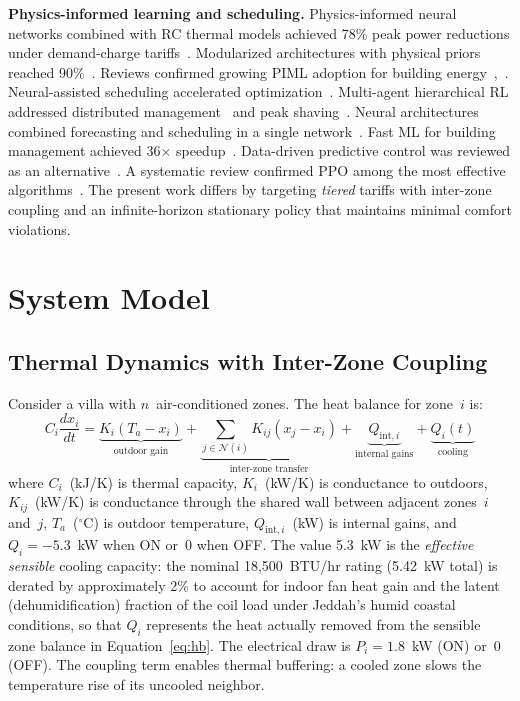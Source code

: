 \documentclass[12pt,a4paper]{article}
\begin{document}
\textbf{Physics-informed learning and scheduling.} Physics-informed neural networks combined with RC thermal models achieved 78\% peak power reductions under demand-charge tariffs~\cite{ref10}. Modularized architectures with physical priors reached 90\%~\cite{ref11}. Reviews confirmed growing PIML adoption for building energy~\cite{ref23},~\cite{ref24}. Neural-assisted scheduling accelerated optimization~\cite{ref25}. Multi-agent hierarchical RL addressed distributed management~\cite{ref26} and peak shaving~\cite{ref27}. Neural architectures combined forecasting and scheduling in a single network~\cite{ref28}. Fast ML for building management achieved 36$\times$ speedup~\cite{ref29}. Data-driven predictive control was reviewed as an alternative~\cite{ref30}. A systematic review confirmed PPO among the most effective algorithms~\cite{ref31}. The present work differs by targeting \textit{tiered} tariffs with inter-zone coupling and an infinite-horizon stationary policy that maintains minimal comfort violations.

\section{System Model}
\label{sec:model}

\subsection{Thermal Dynamics with Inter-Zone Coupling}

Consider a villa with $n$~air-conditioned zones. The heat balance for zone~$i$ is:
\begin{equation}
C_i \frac{dx_i}{dt} = \underbrace{K_i(T_a - x_i)}_{\text{outdoor gain}} + \underbrace{\sum_{j \in \mathcal{N}(i)} K_{ij}(x_j - x_i)}_{\text{inter-zone transfer}} + \underbrace{Q_{\text{int},i}}_{\text{internal gains}} + \underbrace{Q_i(t)}_{\text{cooling}}
\label{eq:hb}
\end{equation}
where $C_i$~(kJ/K) is thermal capacity, $K_i$~(kW/K) is conductance to outdoors, $K_{ij}$~(kW/K) is conductance through the shared wall between adjacent zones~$i$ and~$j$, $T_a$~($^\circ$C) is outdoor temperature, $Q_{\text{int},i}$~(kW) is internal gains, and $Q_i = -5.3$~kW when ON or~0 when OFF. The value 5.3~kW is the \textit{effective sensible} cooling capacity: the nominal 18{,}500~BTU/hr rating (5.42~kW total) is derated by approximately 2\% to account for indoor fan heat gain and the latent (dehumidification) fraction of the coil load under Jeddah's humid coastal conditions, so that $Q_i$ represents the heat actually removed from the sensible zone balance in Equation~\eqref{eq:hb}. The electrical draw is $P_i = 1.8$~kW (ON) or~0 (OFF). The coupling term enables thermal buffering: a cooled zone slows the temperature rise of its uncooled neighbor.
\end{document}
